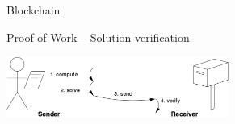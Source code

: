 \begin{frame}{Blockchain}
  \begin{block}{Proof of Work -- Solution-verification}
    \begin{center}
      \includegraphics[height=2cm]{img/solution-verification.png}
    \end{center}
  \end{block}
\end{frame}


